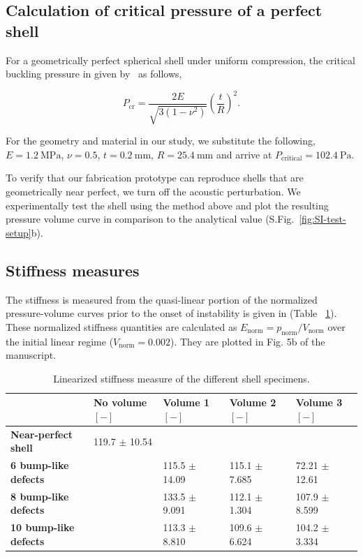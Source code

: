 \documentclass[letter,11pt]{article}
\begin{document}
\subsection{Calculation of critical pressure of a perfect shell}

For a geometrically perfect spherical shell under uniform compression, the critical buckling pressure in given by~\cite{zoelly1915ueber} as follows,

\begin{equation}
P \mathrm{_{cr}}=\frac{2E}{\sqrt{3(1-\nu^2)}}\left(\frac{t}{R}\right)^2.
\end{equation}

For the geometry and material in our study, we substitute the following, $E = \SI{1.2}{\mega\pascal}$, $\nu = 0.5$, $t = \SI{0.2}{\milli\metre}$, $R = \SI{25.4}{\milli\metre}$ and arrive at 
$P_\mathrm{critical} =\SI{102.4}{\pascal}$.

To verify that our fabrication prototype can reproduce shells that are geometrically near perfect, we turn off the acoustic perturbation. We experimentally test the shell using the method above and plot the resulting pressure volume curve in comparison to the analytical value (S.Fig.~\ref{fig:SI-test-setup}b). 

\subsection{Stiffness measures}

The stiffness is measured from the quasi-linear portion of the normalized pressure-volume curves prior to the onset of instability is given in (Table ~\ref{table:stiffness}). These normalized stiffness quantities are calculated as $E_\mathrm{norm}=p_\mathrm{norm}/V_\mathrm{norm}$ over the initial linear regime ($V_\mathrm{norm}=0.002$). They are plotted in Fig. 5b of the manuscript.

\begin{table}[ht!]
\caption{Linearized stiffness measure of the different shell specimens.}
\label{table:stiffness}
\begin{tabular}{@{}lllll@{}}
\toprule
                                                    &\textbf{No volume $[-]$}            &\textbf{Volume 1 $[-]$}       &\textbf{Volume 2 $[-]$} 		&\textbf{Volume 3 $[-]$}     \\ \midrule
 \textbf{Near-perfect shell}    & 119.7 $\pm$ 10.54                      & {\cellcolor[HTML]{C0C0C0} }   & {\cellcolor[HTML]{C0C0C0} }  & {\cellcolor[HTML]{C0C0C0} } \\
 \textbf{6 bump-like defects}  &{\cellcolor[HTML]{C0C0C0} } &115.5 $\pm$ 14.09           & 115.1 $\pm$ 7.685           & 72.21 $\pm$ 12.61          \\
 \textbf{8 bump-like defects}  &{\cellcolor[HTML]{C0C0C0} } &133.5 $\pm$ 9.091           & 112.1 $\pm$ 1.304           & 107.9 $\pm$ 8.599          \\
 \textbf{10 bump-like defects} &{\cellcolor[HTML]{C0C0C0} } &113.3 $\pm$ 8.810           & 109.6 $\pm$ 6.624           & 104.2 $\pm$ 3.334          \\ \bottomrule
\end{tabular}
\end{table}
\end{document}
